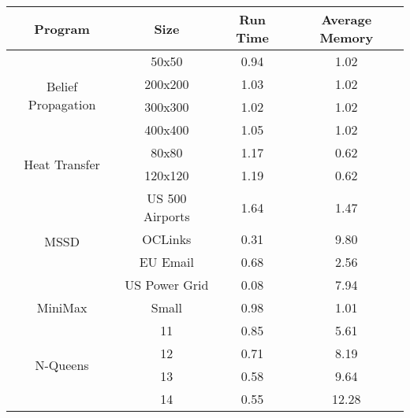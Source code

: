\begin{tabular}{c | c || c | c} \hline
	\textbf{Program} & \textbf{Size} & \textbf{Run Time} & \textbf{Average Memory}\\ \hline \hline
	\multirow{4}{*}{Belief Propagation}  & 50x50 &  0.94  &  1.02
  \\
		 & 200x200 &  1.03  &  1.02
  \\
		 & 300x300 &  1.02  &  1.02
  \\
		 & 400x400 &  1.05  &  1.02
  \\
	\hline
	\multirow{2}{*}{Heat Transfer}  & 80x80 &  1.17  &  0.62
  \\
		 & 120x120 &  1.19  &  0.62
  \\
	\hline
	\multirow{4}{*}{MSSD}  & US 500 Airports &  1.64  &  1.47
  \\
		 & OCLinks &  0.31  &  9.80
  \\
		 & EU Email &  0.68  &  2.56
  \\
		 & US Power Grid &  0.08  &  7.94
  \\
	\hline
	MiniMax  & Small &  0.98  &  1.01
  \\
	\hline
	\multirow{4}{*}{N-Queens}  & 11 &  0.85  &  5.61
  \\
		 & 12 &  0.71  &  8.19
  \\
		 & 13 &  0.58  &  9.64
  \\
		 & 14 &  0.55  &  12.28
  \\
	\hline
\end{tabular}
